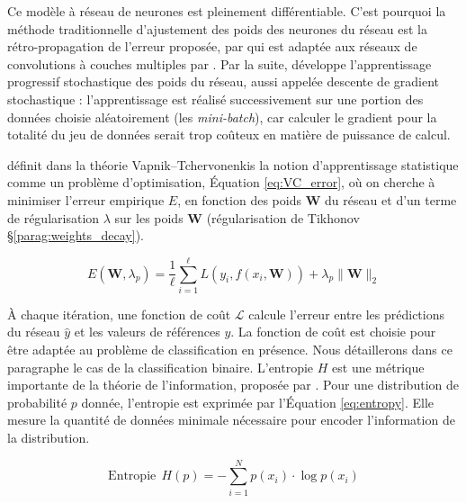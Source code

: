Ce modèle à réseau de neurones est pleinement différentiable.
C'est pourquoi la méthode traditionnelle d'ajustement des poids des neurones du réseau est la rétro-propagation de l'erreur proposée, par \citeauthor{rumelhart_learning_1985} \cite{rumelhart_learning_1985} qui est adaptée aux réseaux de convolutions à couches multiples par \citeauthor{lecun_backpropagation_1989} \cite{lecun_backpropagation_1989}.
Par la suite, \citeauthor{lecun_efficient_1998} \cite{lecun_efficient_1998} développe l'apprentissage progressif stochastique des poids du réseau, aussi appelée descente de gradient stochastique : l'apprentissage est réalisé successivement sur une portion des données choisie aléatoirement  (les \textit{mini-batch}), car  calculer le gradient pour la totalité du jeu de données serait trop coûteux en matière de puissance de calcul.

\cite{vapnik_principles_1992} définit dans la théorie Vapnik–Tchervonenkis la notion d'apprentissage statistique comme un problème d'optimisation, Équation \ref{eq:VC_error}, où on cherche à minimiser l'erreur empirique $E$, en fonction des poids $\mathbf{W}$ du réseau et d'un terme de régularisation $\lambda$ sur les poids $\mathbf{W}$ (régularisation de Tikhonov §\ref{parag:weights_decay}).

\begin{equation} \label{eq:VC_error}
E\left(\mathbf{W}, \lambda_{p}\right)=\frac{1}{\ell} \sum_{i=1}^{\ell} L\left(y_{i}, f\left(x_{i}, \mathbf{W}\right)\right)+\lambda_{p}\|\mathbf{W}\|_{2}
\end{equation}

À chaque itération, une fonction de coût $\mathcal{L}$ calcule l'erreur entre les prédictions du réseau $\hat{y}$ et les valeurs de références $y$.
La fonction de coût est choisie pour être adaptée au problème de classification en présence.
Nous détaillerons dans ce paragraphe le cas de la classification binaire.
L'entropie $H$ est une métrique importante de la théorie de l'information, proposée par \cite{shannon_mathematical_1948}.
Pour une distribution de probabilité $p$ donnée, l'entropie est exprimée par l'Équation \ref{eq:entropy}.
Elle mesure la quantité de données minimale nécessaire pour encoder l'information de la distribution.

\begin{equation} \label{eq:entropy}
\text{Entropie} \ \ H(p) =-\sum_{i=1}^{N} p\left(x_{i}\right) \cdot \log p\left(x_{i}\right)
\end{equation}

